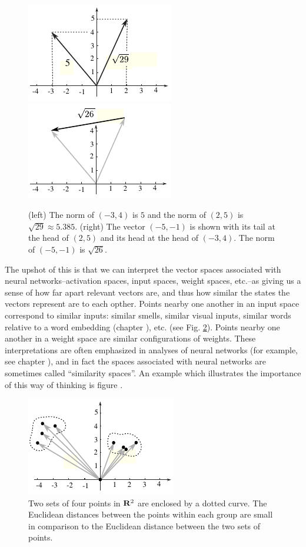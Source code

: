 \begin{figure}[h]
\centering
\includegraphics[scale=1.55]{./images/Norm.pdf}
\qquad
\includegraphics[scale=1.55]{./images/dist.pdf}
\caption{(left) The norm of $(-3,4)$ is $5$ and the norm of $(2,5)$ is 
$\sqrt{29} \approx 5.385$.  (right) The vector $(-5,-1)$ is shown with its tail at the head 
of $(2,5)$ and its head at the head of $(-3,4)$.  The norm of $(-5,-1)$ is 
$\sqrt{26}$.}
\label{metricfig}
\end{figure}

   The upshot of this is that we can interpret the vector spaces associated 
with neural networks--activation spaces, input spaces, weight spaces, etc.--as 
giving us a sense of how far apart relevant vectors are, and thus how similar 
the states the vectors represent are to each opther.  Points nearby one another 
in an input space correspond to similar inputs: similar smells, similar visual 
inputs, similar words relative to a word embedding (chapter 
), etc. (see Fig. \ref{nearfar}).  Points nearby one 
another in a weight space are similar configurations of weights.  These 
interpretations are often emphasized in analyses of neural networks (for 
example, see chapter ), and in fact the spaces 
associated with neural networks are sometimes called ``similarity spaces''.  An 
example which illustrates the importance of this way of thinking is figure 
.

\begin{figure}[h]
\centering
\includegraphics[scale=1.55]{./images/Nearfar.pdf}
\caption{Two sets of four points in ${\bf R}^2$ are enclosed by a dotted curve.  
The Euclidean distances between the points within each group are small in 
comparison to the Euclidean distance between the two sets of points.}
\label{nearfar}
\end{figure}

